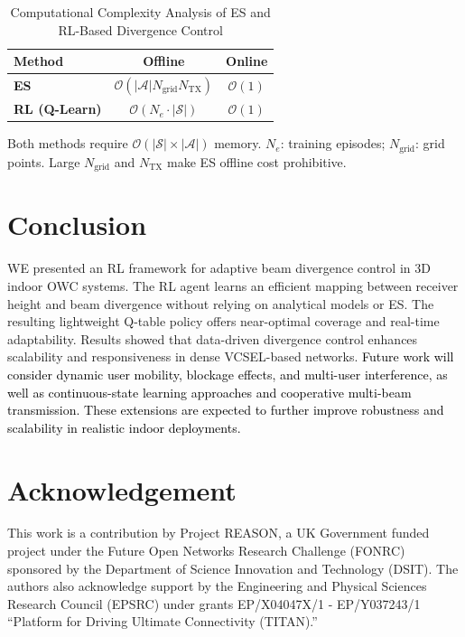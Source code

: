 \documentclass[twocolumn,twoside]{IEEEtran}
\theoremstyle{break}
\begin{document}
\begin{table}[t]
	\centering
	\caption{Computational Complexity Analysis of ES and RL-Based Divergence Control}
	\label{tab:complexity}
	\renewcommand{\arraystretch}{1.1}
	\small
	\begin{tabular}{l|c|c}
		\hline
		\textbf{Method} & \textbf{Offline} & \textbf{Online} \\
		\hline
		\textbf{ES} & $\mathcal{O}(|\mathcal{A}| N_{\text{grid}} N_{\text{TX}})$ & $\mathcal{O}(1)$ \\
		\textbf{RL (Q-Learn)} & $\mathcal{O}(N_e \cdot |\mathcal{S}|)$ & $\mathcal{O}(1)$ \\
		\hline
	\end{tabular}
	
	\vspace{1mm}
	\raggedright
	\footnotesize
	Both methods require $\mathcal{O}(|\mathcal{S}| \times |\mathcal{A}|)$ memory. $N_e$: training episodes; $N_{\text{grid}}$: grid points. Large $N_{\text{grid}}$ and $N_{\text{TX}}$ make ES offline cost prohibitive.
\end{table}
\section{Conclusion}
\label{Conclusion}
WE presented an RL framework for adaptive beam divergence control in 3D indoor OWC systems. The RL agent learns an efficient mapping between receiver height and beam divergence without relying on analytical models or ES. The resulting lightweight Q-table policy offers near-optimal coverage and real-time adaptability. Results showed that data-driven divergence control enhances scalability and responsiveness in dense VCSEL-based networks. \textcolor{black}{Future work will consider dynamic user mobility, blockage effects, and multi-user interference, as well as continuous-state learning approaches and cooperative multi-beam transmission. These extensions are expected to further improve robustness and scalability in realistic indoor deployments.}
\section*{Acknowledgement}
{This work is a contribution by Project REASON, a UK Government funded project under the Future Open Networks Research Challenge (FONRC) sponsored by the Department of Science Innovation and Technology (DSIT). The authors also acknowledge support by the Engineering and Physical Sciences Research Council (EPSRC) under grants EP/X04047X/1 - EP/Y037243/1 ``Platform for Driving Ultimate Connectivity (TITAN).''}
	
%	
	
\end{document}
